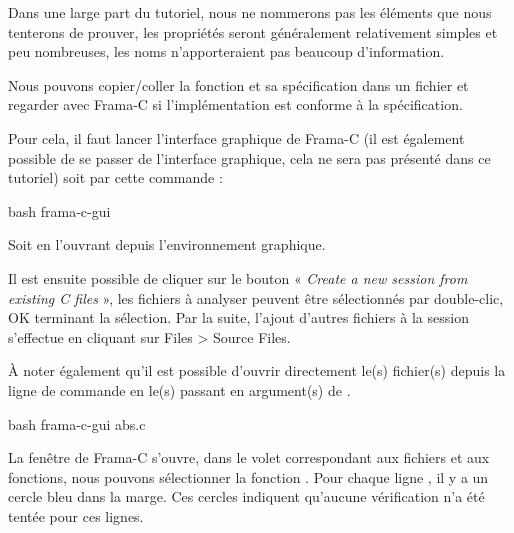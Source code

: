 


Dans une large part du tutoriel, nous ne nommerons pas les éléments que nous
tenterons de prouver, les propriétés seront généralement relativement simples
et peu nombreuses, les noms n'apporteraient pas beaucoup d'information.



Nous pouvons copier/coller la fonction  et sa spécification dans un
fichier  et regarder avec Frama-C si l'implémentation est conforme à la
spécification.



Pour cela, il faut lancer l'interface graphique de Frama-C (il est également
possible de se passer de l'interface graphique, cela ne sera pas présenté
dans ce tutoriel) soit par cette commande :



\begin{CodeBlock}{bash}
frama-c-gui
\end{CodeBlock}



Soit en l'ouvrant depuis l'environnement graphique.



Il est ensuite possible de cliquer sur le bouton « \textit{Create a new session from
existing C files} », les fichiers à analyser peuvent être sélectionnés par
double-clic, OK terminant la sélection. Par la suite, l'ajout d'autres
fichiers à la session s'effectue en cliquant sur Files > Source Files.



À noter également qu'il est possible d'ouvrir directement le(s) fichier(s)
depuis la ligne de commande en le(s) passant en argument(s) de .



\begin{CodeBlock}{bash}
frama-c-gui abs.c
\end{CodeBlock}





La fenêtre de Frama-C s'ouvre, dans le volet correspondant aux fichiers et aux
fonctions, nous pouvons sélectionner la fonction .
Pour chaque ligne , il y a un cercle bleu dans la marge.
Ces cercles indiquent qu'aucune vérification n'a été tentée pour ces lignes.



